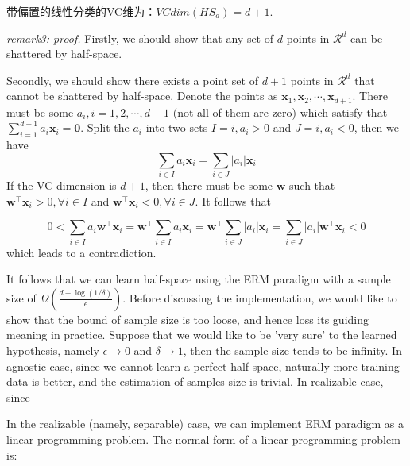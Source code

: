 \documentclass{article}
\begin{document}
	带偏置的线性分类的VC维为：$VCdim(HS_d)=d+1$.  

	\vspace{2mm}
	\begin{scriptsize}
	\begin{spacing}{1.2}
	{\sffamily
	\noindent\textit{\underline{remark3: proof.}} Firstly, we should show that any set of $d$ points in $\mathcal{R}^d$ can be shattered by half-space. 
	
	Secondly, we should show there exists a point set of $d+1$ points in $\mathcal{R}^{d}$ that cannot be shattered by half-space. Denote the points as $\mathbf{x}_1, \mathbf{x}_2, \cdots, \mathbf{x}_{d+1}$. There must be some $a_i, i=1,2,\cdots,d+1$ (not all of them are zero) which satisfy that $\sum_{i=1}^{d+1} a_i \mathbf{x}_i = \mathbf{0}$. Split the $a_i$ into two sets $I={i,a_i>0}$ and $J={i,a_i<0}$, then we have 
	\begin{equation*}
	\sum_{i\in I} a_i \mathbf{x}_i = \sum_{i \in J} |a_i| \mathbf{x}_i
	\end{equation*}
If the VC dimension is $d+1$, then there must be some $\mathbf{w}$ such that $\mathbf{w}^\top \mathbf{x}_i > 0, \forall i \in I$ and $\mathbf{w}^\top \mathbf{x}_i < 0, \forall i \in J$. It follows that
	
	\begin{equation*}
	0 < \sum_{i \in I} a_i \mathbf{w}^\top \mathbf{x}_i = \mathbf{w}^\top  \sum_{i \in I} a_i \mathbf{x}_i = \mathbf{w}^\top  \sum_{i \in J} |a_i| \mathbf{x}_i =  \sum_{i \in J} |a_i| \mathbf{w}^\top \mathbf{x}_i  < 0
	\end{equation*}
which leads to a contradiction.}
	\end{spacing}
	\end{scriptsize}
	
	It follows that we can learn half-space using the ERM paradigm with a sample size of $\Omega(\frac{d+\log(1/\delta)}{\epsilon})$. Before discussing the implementation, we would like to show that the bound of sample size is too loose, and hence loss its guiding meaning in practice.  Suppose that we would like to be 'very sure' to the learned hypothesis, namely $\epsilon\rightarrow 0$ and $\delta\rightarrow 1$, then the sample size tends to be infinity. In agnostic case, since we cannot learn  a perfect half space, naturally  more training data is better, and the estimation of samples size is trivial. In realizable case, since 
	
	In the realizable (namely, separable) case, we can implement ERM paradigm as a linear programming problem. The normal form of a linear programming problem is:
	
\end{document}
